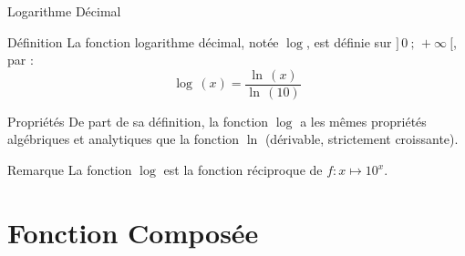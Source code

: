 \documentclass{coursbook}
\begin{document}
    \pagebreak
    \begin{Gpartie}{Logarithme Décimal} 
        \begin{Spartie}{Définition} 
            La fonction logarithme décimal, notée $\log$, est définie sur $\big]\,0~;\,+\infty~\big[$, par :
            \[\log\,(x)=\frac{\ln\,(x)}{\ln\,(10)}\]
        \end{Spartie}
        \begin{Spartie}{Propriétés} 
            De part de sa définition, la fonction $\log$ a les mêmes propriétés algébriques et analytiques que la fonction $\ln$ (dérivable, strictement croissante).
        \end{Spartie}
        \begin{Spartie}{Remarque} 
            La fonction $\log$ est la fonction réciproque de $f:x\mapsto 10^x$.
        \end{Spartie}
    \end{Gpartie}





    \chapter{Fonction Composée}
\end{document}
